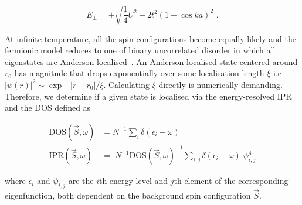 \[E_{\pm} = \pm\sqrt{\frac{1}{4}U^2 + 2t^2(1 + \cos ka)^2}\;.\]

At infinite temperature, all the spin configurations become equally likely and the fermionic model reduces to one of binary uncorrelated disorder in which all eigenstates are Anderson localised~\autocite{abrahamsScalingTheoryLocalization1979}. An Anderson localised state centered around \(r_0\) has magnitude that drops exponentially over some localisation length \(\xi\) i.e \(|\psi(r)|^2 \sim \exp{-|r - r_0|/\xi}\). Calculating \(\xi\) directly is numerically demanding. Therefore, we determine if a given state is localised via the energy-resolved IPR and the DOS defined as

\[\begin{aligned}
\mathrm{DOS}(\vec{S}, \omega)& = N^{-1} \sum_{i} \delta(\epsilon_i - \omega)\\
\mathrm{IPR}(\vec{S}, \omega)& = \; N^{-1} \mathrm{DOS}(\vec{S}, \omega)^{-1} \sum_{i,j} \delta(\epsilon_i - \omega)\;\psi^{4}_{i,j}\end{aligned}\]

where \(\epsilon_i\) and \(\psi_{i,j}\) are the \(i\)th energy level and \(j\)th element of the corresponding eigenfunction, both dependent on the background spin configuration \(\vec{S}\).

